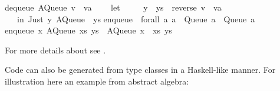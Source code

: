 \begin{isabellebody}
\begin{isamarkuptext}
dequeue\ {}AQueue\ {}v\ {}\ va{}\ {}{}{}\ {}\isanewline
\ \ let\ {}\isanewline
\ \ \ \ {}y\ {}\ ys{}\ {}\ reverse\ {}v\ {}\ va{}{}\isanewline
\ \ {}\ in\ {}Just\ y{}\ AQueue\ {}{}\ ys{}{}\isanewline
\isanewline
enqueue\ {}{}\ forall\ a{}\ a\ {}{}\ Queue\ a\ {}{}\ Queue\ a{}\isanewline
enqueue\ x\ {}AQueue\ xs\ ys{}\ {}\ AQueue\ {}x\ {}\ xs{}\ ys{}\isanewline
\isanewline
{}\isanewline%
\end{isamarkuptext}%
\isamarkuptrue%
%
\endisatagquotetypewriter
{\isafoldquotetypewriter}%
%
\isadelimquotetypewriter
%
\endisadelimquotetypewriter
%
\begin{isamarkuptext}%
\noindent For more details about \hyperlink{command.export-code}{\mbox{}} see
  .%
\end{isamarkuptext}%
\isamarkuptrue%
%
\isamarkuptrue%
%
\begin{isamarkuptext}%
Code can also be generated from type classes in a Haskell-like
  manner.  For illustration here an example from abstract algebra:%
\end{isamarkuptext}%
\isamarkuptrue%
%
\isadelimquote
%
\endisadelimquote
%
\isatagquote
{}\isamarkupfalse%

\end{isabellebody}

